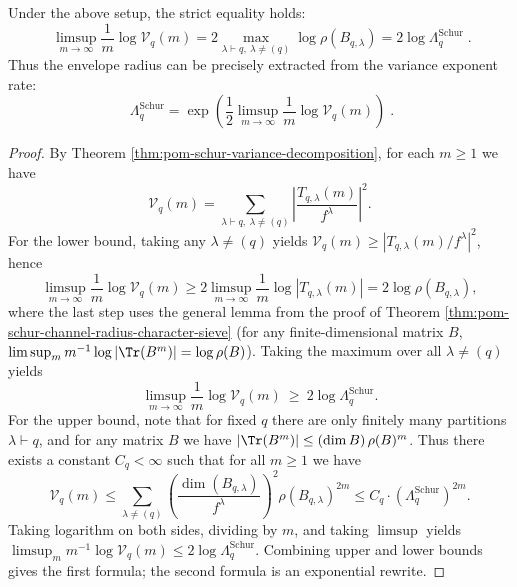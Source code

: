 \begin{theorem}\label{thm:pom-schur-variance-growth-rate-spectral-identity}
Under the above setup, the strict equality holds:
\[
\boxed{\;
\limsup_{m\to\infty}\frac{1}{m}\log \mathcal V_q(m)
=
2\max_{\lambda\vdash q,\ \lambda\neq(q)}\log\rho(B_{q,\lambda})
=
2\log\Lambda_q^{\mathrm{Schur}}\; }.
\]
Thus the envelope radius can be precisely extracted from the variance exponent rate:
\[
\boxed{\;
\Lambda_q^{\mathrm{Schur}}
=\exp\!\left(\frac12\limsup_{m\to\infty}\frac{1}{m}\log \mathcal V_q(m)\right)\; } .
\]
\end{theorem}
\begin{proof}
By Theorem \ref{thm:pom-schur-variance-decomposition}, for each \(m\ge 1\) we have
\[
\mathcal V_q(m)=\sum_{\lambda\vdash q,\ \lambda\neq(q)}\left|\frac{T_{q,\lambda}(m)}{f^\lambda}\right|^2.
\]
For the lower bound, taking any \(\lambda\neq(q)\) yields \(\mathcal V_q(m)\ge |T_{q,\lambda}(m)/f^\lambda|^2\), hence
\[
\limsup_{m\to\infty}\frac{1}{m}\log \mathcal V_q(m)
\ge
2\limsup_{m\to\infty}\frac{1}{m}\log|T_{q,\lambda}(m)|
=2\log\rho(B_{q,\lambda}),
\]
where the last step uses the general lemma from the proof of Theorem \ref{thm:pom-schur-channel-radius-character-sieve} (for any finite-dimensional matrix \(B\), \(\limsup_m m^{-1}\log|\Tr(B^m)|=\log\rho(B)\)).
Taking the maximum over all \(\lambda\neq(q)\) yields
\[
\limsup_{m\to\infty}\frac{1}{m}\log \mathcal V_q(m)\ \ge\ 2\log\Lambda_q^{\mathrm{Schur}}.
\]
For the upper bound, note that for fixed \(q\) there are only finitely many partitions \(\lambda\vdash q\), and for any matrix \(B\) we have
\(|\Tr(B^m)|\le (\dim B)\,\rho(B)^m\).
Thus there exists a constant \(C_q<\infty\) such that for all \(m\ge 1\) we have
\[
\mathcal V_q(m)
\le
\sum_{\lambda\neq(q)}\left(\frac{\dim(B_{q,\lambda})}{f^\lambda}\right)^2\rho(B_{q,\lambda})^{2m}
\le
C_q\cdot(\Lambda_q^{\mathrm{Schur}})^{2m}.
\]
Taking logarithm on both sides, dividing by \(m\), and taking \(\limsup\) yields
\(
\limsup_m m^{-1}\log\mathcal V_q(m)\le 2\log\Lambda_q^{\mathrm{Schur}}
\).
Combining upper and lower bounds gives the first formula; the second formula is an exponential rewrite.
\end{proof}

